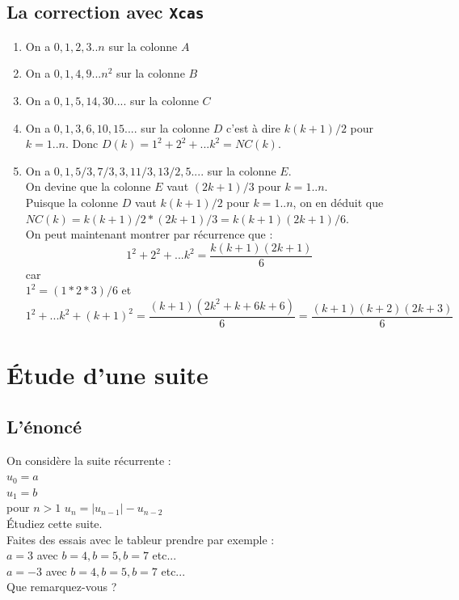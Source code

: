 \documentclass[a4paper,11pt]{book}
\begin{document}
\subsection{La correction avec {\tt Xcas}}
\begin{enumerate}
\item On a $0,1,2,3..n$ sur la colonne $A$
\item On a $0,1,4,9...n^2$ sur la colonne $B$
\item On a $0,1,5,14,30....$ sur la colonne $C$
\item On a $0,1,3,6,10,15....$ sur la colonne $D$ c'est \`a dire $k(k+1)/2$
pour $k=1..n$. Donc $D(k)=1^2+2^2+...k^2=NC(k)$. 
\item On a $0,1,5/3,7/3,3,11/3,13/2,5....$ sur la colonne $E$.\\
On devine que la colonne $E$ vaut $(2k+1)/3$ pour $k=1..n$.\\
Puisque la colonne $D$ vaut $k(k+1)/2$ pour $k=1..n$, on en d\'eduit que
$NC(k)=k(k+1)/2*(2k+1)/3=k(k+1)(2k+1)/6$.\\
On peut maintenant montrer par r\'ecurrence que :
$$1^2+2^2+...k^2=\frac{k(k+1)(2k+1)}{6}$$ car\\
$1^2=(1*2*3)/6$ et\\
$$ 1^2+...k^2+(k+1)^2=\frac{(k+1)(2k^2+k+6k+6)}{6}=\frac{(k+1)(k+2)(2k+3)}{6}$$
\end{enumerate}

\section{\'Etude d'une suite}
\subsection{L'\'enonc\'e}
On consid\`ere la suite r\'ecurrente :\\
$u_0=a$\\
$u_1=b$\\
pour $n>1$ $u_n=|u_{n-1}|-u_{n-2}$\\
\'Etudiez cette suite.\\
Faites des essais avec le tableur prendre par exemple :\\
$a=3$ avec $b=4, b=5,b=7$ etc...\\
$a=-3$ avec $b=4, b=5,b=7$ etc...\\
Que remarquez-vous ?\\
\end{document}
